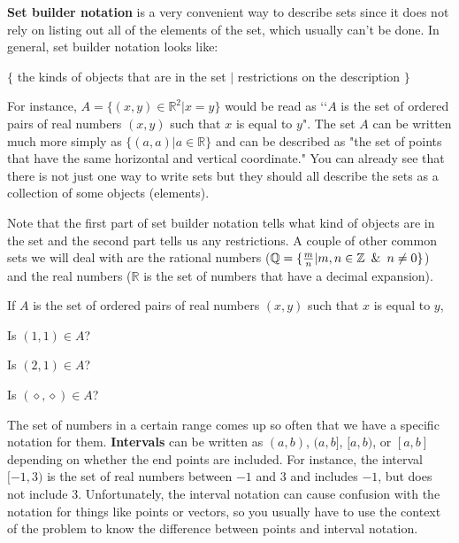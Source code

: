 \begin{info}
\textbf{Set builder notation} is a very convenient way to describe sets since it does not rely on listing out all of the elements of the set, which usually can't be done. In general, set builder notation looks like:

$\{ $ the kinds of objects that are in the set $|$ restrictions on the description $\}$

For instance, $A=\{ (x,y) \in \mathbb{R}^2 | x=y\}$ would be read as \lq\lq{$A$ is the set of ordered pairs of real numbers $(x,y)$ such that $x$ is equal to $y$}". The set $A$ can be written much more simply as $\{(a,a)|a \in \mathbb{R} \}$ and can be described as "the set of points that have the same horizontal and vertical coordinate." You can already see that there is not just one way to write sets but they should all describe the sets as a collection of some objects (elements).

Note that the first part of set builder notation tells what kind of objects are in the set and the second part tells us any restrictions.
A couple of other common sets we will deal with are the rational numbers ($\mathbb{Q}=\{ \frac{m}{n} | m,n \in \mathbb{Z} \enskip \& \enskip  n \neq 0 \}$) and the real numbers ($\mathbb{R}$ is the set of numbers that have a decimal expansion).
\end{info}
\bq If $A$ is the set of ordered pairs of real numbers $(x,y)$ such that $x$ is equal to $y$,
\be
\item Is $(1,1)\in A$?
\item Is $(2,1)\in A$?
\item Is $(\diamond,\diamond) \in A$?
\ee \eq
\begin{info}
The set of numbers in a certain range comes up so often that we have a specific notation for them. \textbf{Intervals} can be written as $(a,b)$, $(a,b]$, $[a,b)$, or $[a,b]$ depending on whether the end points are included. For instance, the interval $[-1,3)$ is the set of real numbers between $-1$ and $3$ and includes $-1$, but does not include $3$. Unfortunately, the interval notation can cause confusion with the notation for things like points or vectors, so you usually have to use the context of the problem to know the difference between points and interval notation.

\end{info}

